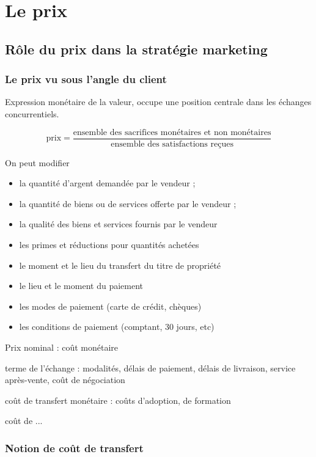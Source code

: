 
\chapter{Le prix}
	
	\section{Rôle du prix dans la stratégie marketing}
	
		
		\subsection{Le prix vu sous l'angle du client}
		
		Expression monétaire de la valeur, occupe une position centrale dans les échanges concurrentiels. 
		
		$$\text{prix} = \frac{\text{ensemble des sacrifices monétaires et non monétaires}}{\text{ensemble des satisfactions reçues}}$$
		
		
		On peut modifier
		
		\begin{itemize}
			\item la quantité d'argent demandée par le vendeur ;
			\item la quantité de biens ou de services offerte par le vendeur ;
			\item la qualité des biens et services fournis par le vendeur
			\item les primes et réductions pour quantités achetées
			\item le moment et le lieu du transfert du titre de propriété
			\item le lieu et le moment du paiement
			\item les modes de paiement (carte de crédit, chèques)
			\item les conditions de paiement (comptant, 30 jours, etc)
		\end{itemize}
		\n
		Prix nominal : coût monétaire
		
		terme de l'échange : modalités, délais de paiement, délais de livraison, service après-vente, coût de négociation
		
		coût de transfert monétaire : coûts d'adoption, de formation
		
		coût de ...
		
		\subsection{Notion de coût de transfert}
		
